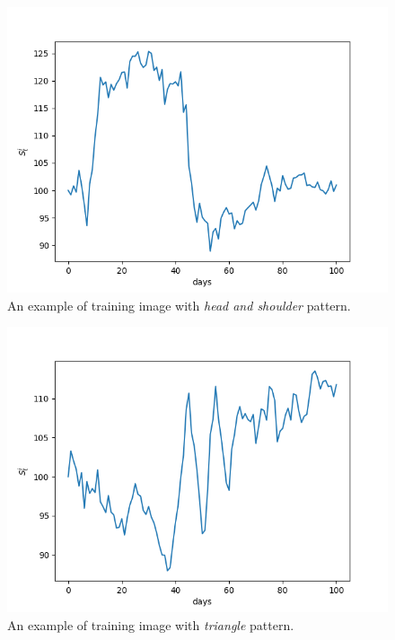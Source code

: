 \begin{figure}
	\centering
	\includegraphics[width=0.5\linewidth]{figures/image_2.png}
	\caption{An example of training image with \emph{head and shoulder} pattern.}
        \label{fig:head_and_shoulder}
\end{figure}

\begin{figure}
	\centering
	\includegraphics[width=0.5\linewidth]{figures/image_0.png}
	\caption{An example of training image with \emph{triangle} pattern.}
        \label{fig:triangle}
\end{figure}

